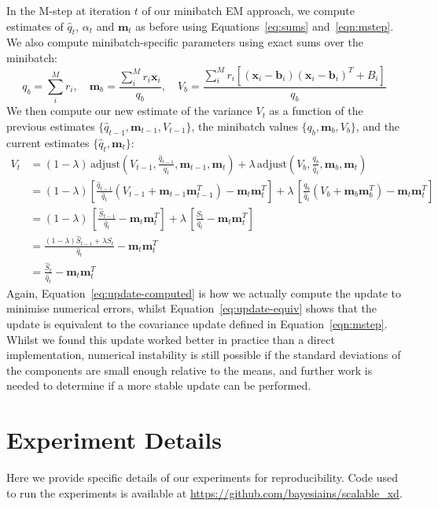 \documentclass{article}
\newcommand{\bx}{\mathbf{x}}
\newcommand{\bm}{\mathbf{m}}
\newcommand{\bb}{\mathbf{b}}
\begin{document}
In the M-step at iteration $t$ of our minibatch EM approach, we compute estimates of $\hat{q}_t$, $\alpha_t$ and $\bm_t$ as before using Equations~\ref{eq:sums} and~\ref{eqn:mstep}.
We also compute minibatch-specific parameters using exact sums over the minibatch:
\begin{equation}
q_b = \sum_i^M r_i, \quad
\bm_b = \frac{\sum_i^M r_i \bx_i}{q_b},\quad V_b = \frac{\sum_i^M r_i[(\bx_i - \bb_i)(\bx_i - \bb_i)^T  + B_i]}{q_b}
\end{equation}{}
We then compute our new estimate of the variance $V_t$ as a function of the previous estimates $\{\hat{q}_{t-1}, \bm_{t-1}, V_{t-1} \}$, the minibatch values $\{q_b, \bm_b, V_b\}$, and the current estimates $\{\hat{q}_t,\bm_t \}$:
\begin{align}
V_{t} &= (1 - \lambda)\,\text{adjust}(V_{t-1}, \frac{\hat{q}_{t-1}}{\hat{q}_t}, \bm_{t-1}, \bm_t) + \lambda\, \text{adjust}(V_{b}, \frac{q_b}{\hat{q}_t}, \bm_{b}, \bm_{t}) \label{eq:update-computed}\\
&= (1 - \lambda) \left[\frac{\hat{q}_{t-1}}{\hat{q}_t} \left(V_{t-1} + \bm_{t-1}\bm_{t-1}^T \right) -\bm_t \bm_t^T \right] + \lambda\,\left[\frac{q_b}{\hat{q}_t} \left(V_{b} + \bm_{b}\bm_{b}^T \right) -\bm_t \bm_t^T \right] \\
&= (1 - \lambda)\,\left[\frac{\hat{S}_{t-1}}{\hat{q}_t} -\bm_t \bm_t^T \right] + \lambda\, \left[\frac{S_t}{\hat{q}_t} -\bm_t \bm_t^T \right] \\
&= \frac{(1- \lambda)\hat{S}_{t-1} + \lambda S_t}{\hat{q}_t} - \bm_t\bm_t^T \\
&= \frac{\hat{S}_t}{\hat{q}_t} - \bm_t\bm_t^T \label{eq:update-equiv}
\end{align}
Again, Equation~\ref{eq:update-computed} is how we actually compute the update to minimise numerical errors, whilst Equation~\ref{eq:update-equiv} shows that the update is equivalent to the covariance update defined in Equation~\ref{eqn:mstep}.
Whilst we found this update worked better in practice than a direct implementation, numerical instability is still possible if the standard deviations of the components are small enough relative to the means, and further work is needed to determine if a more stable update can be performed.

\section{Experiment Details}
\label{apx:repro}

Here we provide specific details of our experiments for reproducibility.
Code used to run the experiments is available at \url{https://github.com/bayesiains/scalable_xd}.
\end{document}
